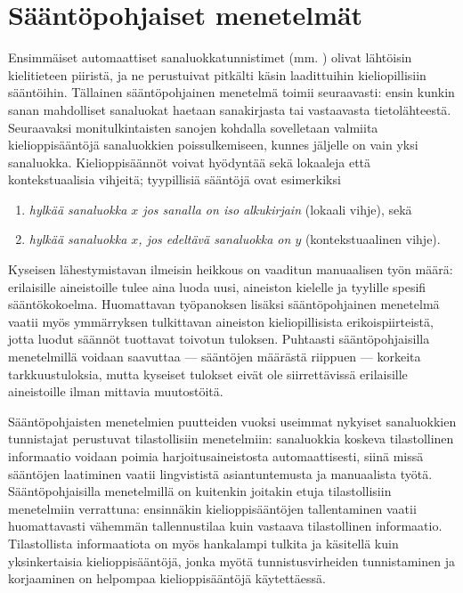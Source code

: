 \documentclass[utf8,bachelor,manualbib]{gradu3}
\begin{document}
\chapter{Sääntöpohjaiset menetelmät}

Ensimmäiset automaattiset sanaluokkatunnistimet (mm. \citealp{greene1971}) olivat lähtöisin kielitieteen piiristä, ja ne perustuivat pitkälti käsin laadittuihin kieliopillisiin sääntöihin. Tällainen sääntöpohjainen menetelmä toimii seuraavasti: ensin kunkin sanan mahdolliset sanaluokat haetaan sanakirjasta tai vastaavasta tietolähteestä. Seuraavaksi monitulkintaisten sanojen kohdalla sovelletaan valmiita kielioppisääntöjä sanaluokkien poissulkemiseen, kunnes jäljelle on vain yksi sanaluokka. Kielioppisäännöt voivat hyödyntää sekä lokaaleja että kontekstuaalisia vihjeitä; tyypillisiä sääntöjä ovat esimerkiksi

\begin{enumerate}
\item \textit{hylkää sanaluokka $x$ jos sanalla on iso alkukirjain} (lokaali vihje), sekä
\item \textit{hylkää sanaluokka $x$, jos edeltävä sanaluokka on $y$} (kontekstuaalinen vihje).
\end{enumerate}

Kyseisen lähestymistavan ilmeisin heikkous on vaaditun manuaalisen työn määrä: erilaisille aineistoille tulee aina luoda uusi, aineiston kielelle ja tyylille spesifi sääntökokoelma. Huomattavan työpanoksen lisäksi sääntöpohjainen menetelmä vaatii myös ymmärryksen tulkittavan aineiston kieliopillisista erikoispiirteistä, jotta luodut säännöt tuottavat toivotun tuloksen. Puhtaasti sääntöpohjaisilla menetelmillä voidaan saavuttaa --- sääntöjen määrästä riippuen --- korkeita tarkkuustuloksia, mutta kyseiset tulokset eivät ole siirrettävissä erilaisille aineistoille ilman mittavia muutostöitä.

Sääntöpohjaisten menetelmien puutteiden vuoksi useimmat nykyiset sanaluokkien tunnistajat perustuvat tilastollisiin menetelmiin: sanaluokkia koskeva tilastollinen informaatio voidaan poimia harjoitusaineistosta automaattisesti, siinä missä sääntöjen laatiminen vaatii lingvististä asiantuntemusta ja manuaalista työtä. Sääntöpohjaisilla menetelmillä on kuitenkin joitakin etuja tilastollisiin menetelmiin verrattuna: ensinnäkin kielioppisääntöjen tallentaminen vaatii huomattavasti vähemmän tallennustilaa kuin vastaava tilastollinen informaatio. Tilastollista informaatiota on myös hankalampi tulkita ja käsitellä kuin yksinkertaisia kielioppisääntöjä, jonka myötä tunnistusvirheiden tunnistaminen ja korjaaminen on helpompaa kielioppisääntöjä käytettäessä. \citep{brill1992}
\end{document}
